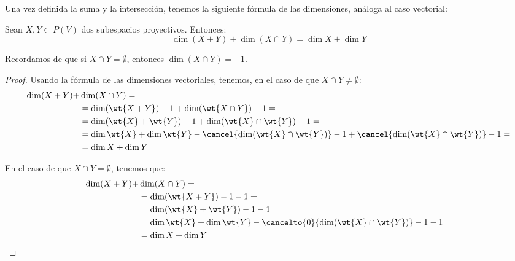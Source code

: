 Una vez definida la suma y la intersección, tenemos la siguiente fórmula de las dimensiones, análoga al caso vectorial:
\begin{prop}
    Sean $X,Y\subset P(V)$ dos subespacios proyectivos. Entonces:
    \begin{equation*}
        \dim (X+Y) + \dim (X\cap Y) = \dim X + \dim Y
    \end{equation*}

    Recordamos de que si $X\cap Y = \emptyset$, entonces $\dim (X\cap Y) = -1$.
\end{prop}
\begin{proof}
    Usando la fórmula de las dimensiones vectoriales, tenemos, en el caso de que $X\cap Y \neq \emptyset$:
    \begin{equation*}
        \begin{split}
            \dim (X+Y) +& \dim (X\cap Y) =\\
            &= \dim (\wt{X+Y}) -1 + \dim (\wt{X\cap Y}) -1 =\\
            &= \dim (\wt{X} + \wt{Y}) -1 + \dim (\wt{X} \cap \wt{Y}) -1 =\\
            &= \dim \wt{X} + \dim \wt{Y}  - \cancel{\dim (\wt{X} \cap \wt{Y})} -1 + \cancel{\dim (\wt{X} \cap \wt{Y})} -1  =\\
            &= \dim X + \dim Y
        \end{split}
    \end{equation*}

    En el caso de que $X\cap Y = \emptyset$, tenemos que:
    \begin{equation*}
        \begin{split}
            \dim (X+Y) +& \dim (X\cap Y) =\\
            &= \dim (\wt{X+Y}) -1 -1 =\\
            &= \dim (\wt{X} + \wt{Y}) -1 -1 =\\
            &= \dim \wt{X} + \dim \wt{Y}  - \cancelto{0}{\dim (\wt{X} \cap \wt{Y})} -1 -1  =\\
            &= \dim X + \dim Y
        \end{split}
    \end{equation*}
\end{proof}

